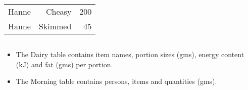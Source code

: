 \documentclass[dvipsnames]{beamer}
\begin{document}
\begin{frame}
\begin{columns}[t]
\begin{column}{.4\textwidth}
\begin{footnotesize}
\begin{tabular}{|l|r|r|}
    Hanne &  Cheasy         & 200 \\
    Hanne &  Skimmed        &  45 \\ \hline
  \end{tabular}
\end{footnotesize}
\end{column}  
\end{columns}

\begin{itemize}
\item The Dairy table contains item names, portion sizes (gms),
  energy content (kJ) and fat (gms) per portion.

\item The Morning table contains persons, items and quantities (gms).
\end{itemize}
\end{frame}
\end{document}
